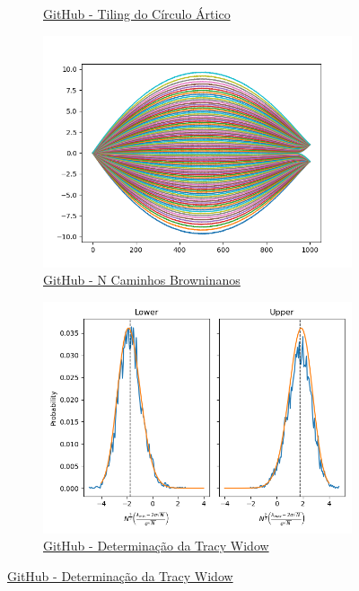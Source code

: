 \documentclass[12pt]{report}
\begin{document}
\begin{figure}
\begin{subfigure}{.5\textwidth}
		\caption{\href{https://github.com/Joao-vap/RMT-Code/tree/main/Tiling}{GitHub - Tiling do Círculo Ártico}}
		\label{fig:a2}
	\end{subfigure}
	\begin{subfigure}{.5\textwidth}
		\centering
		\includegraphics[width=\linewidth]{Assets/nonintersectBrownianPart-2f}
		\caption{\href{https://github.com/Joao-vap/RMT-Code/blob/main/tracywidow/N-Brownian.py}{GitHub - N Caminhos Browninanos}}
		\label{fig:a3}
	\end{subfigure}
	\begin{subfigure}{.5\textwidth}
		\centering
		\includegraphics[width=\linewidth]{Assets/nonintersectBrownianPart-tracywidow001-distreal}
		\caption{\href{https://github.com/Joao-vap/RMT-Code/blob/main/tracywidow/TtracyWidow.py}{GitHub - Determinação da Tracy Widow}}

\end{subfigure}
\end{figure}
\end{document}
